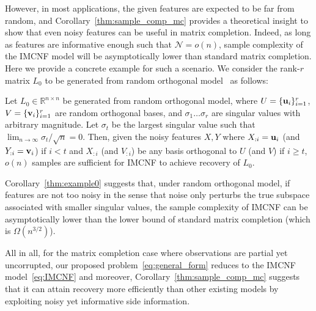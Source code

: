 \documentclass[twoside,11pt]{article}
\def\bu{{\bf u}}
\def\bv{{\bf v}}
\def\R{\mathbb{R}}
\def\nmax{{\mathcal N}}
\def\realL{L_0}
\begin{document}
However, in most applications, the given features are expected to be far from random, and
Corollary~\ref{thm:sample_comp_mc} provides a theoretical insight to show that
even noisy features can be useful in matrix completion.
Indeed, as long as features are informative enough such that
$\nmax = o(n)$, sample complexity of the IMCNF model will be asymptotically lower than
standard matrix completion.
Here we provide a concrete example for such a scenario.
We consider the rank-$r$ matrix $\realL$ to be generated from
random orthogonal model~\citep{Candes12a} as follows:
\begin{corollary}
\label{thm:example0}
Let $\realL \in \R^{n\times n}$ be generated from random orthogonal model,
where $U=\{\bu_i\}_{i=1}^r$, $V=\{\bv_i\}_{i=1}^r$ are random orthogonal bases, and
$\sigma_1 \dots \sigma_r$ are singular values with arbitrary magnitude.
Let $\sigma_t$ be the largest singular value such that
$\lim_{n\rightarrow \infty} \sigma_t/\sqrt{n} = 0$.  Then,
given the noisy features $X, Y$ where $X_{:i} = \bu_i$ (and $Y_{:i} = \bv_i$)
if $i < t$ and $X_{:i}$ (and $V_{:i}$) be any basis orthogonal to $U$ (and $V$)
if $i \geq t$, $o(n)$ samples are sufficient for IMCNF to achieve recovery of $\realL$.
\end{corollary}

Corollary~\ref{thm:example0} suggests that, under random orthogonal model,
if features are not too noisy in the sense that noise only perturbs the true
subspace associated with smaller singular values,
the sample complexity of IMCNF can be asymptotically lower than
the lower bound of standard matrix completion (which is $\Omega(n^{3/2})$).

All in all, for the matrix completion case where observations are partial yet uncorrupted,
our proposed problem~\eqref{eq:general_form} reduces to the IMCNF model~\eqref{eq:IMCNF} and
moreover, Corollary~\ref{thm:sample_comp_mc} suggests that it can attain
recovery more efficiently than other existing models by exploiting
noisy yet informative side information.
\end{document}
